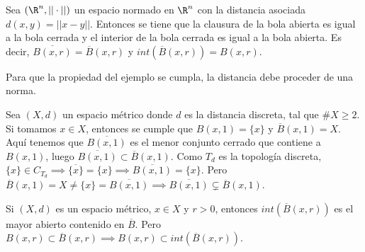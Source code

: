\begin{exmp}
  Sea $(\R^n, ||\cdot||)$ un espacio normado en $\R^n$ con la distancia asociada $d(x,y)=||x-y||$. Entonces se tiene que la clausura de la bola abierta es igual a la bola cerrada y el interior de la bola cerrada es igual a la bola abierta. Es decir, $\overline{B(x,r)}=\overline{B}(x,r)$ y $int(\overline{B}(x,r))=B(x,r)$.
\end{exmp}
Para que la propiedad del ejemplo se cumpla, la distancia debe proceder de una norma.
\begin{exmp}
  Sea $(X,d)$ un espacio métrico donde $d$ es la distancia discreta, tal que $\#X \ge 2$. Si tomamos $x \in X$, entonces se cumple que $B(x,1)=\{x\}$ y $\overline{B}(x,1)=X$. Aquí tenemos que $\overline{B(x,1)}$ es el menor conjunto cerrado que contiene a $B(x,1)$, luego $\overline{B(x,1)} \subset \overline{B}(x,1)$. Como $T_d$ es la topología discreta, $\{x\} \in C_{T_d} \implies \overline{\{x\}} = \{x\} \implies \overline{B(x,1)}=\{x\}$. Pero $\overline{B}(x,1)=X \neq \{x\} = \overline{B(x,1)} \implies \overline{B(x,1)} \subsetneq \overline{B}(x,1)$.
\end{exmp}
\begin{properties}
  Si $(X,d)$ es un espacio métrico, $x \in X$ y $r >0$, entonces $int(\overline{B}(x,r))$ es el mayor abierto contenido en $\overline{B}$. Pero $B(x,r) \subset \overline{B}(x,r) \implies B(x,r) \subset int(\overline{B}(x,r))$.
\end{properties}

